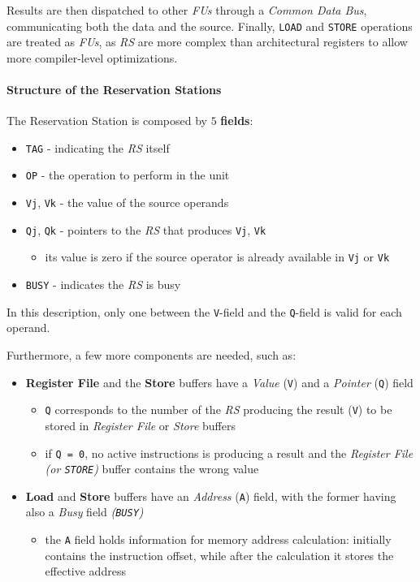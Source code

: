\documentclass[english]{article}
\begin{document}
Results are then dispatched to other \textit{FUs} through a \textit{Common Data Bus}, communicating both the data and the source.
Finally, \texttt{LOAD} and \texttt{STORE} operations are treated as \textit{FUs}, as \textit{RS} are more complex than architectural registers to allow more compiler-level optimizations.

\paragraph{Structure of the Reservation Stations}

The Reservation Station is composed by \(5\) \textbf{fields}:

\begin{itemize}
  \item \texttt{TAG} - indicating the \textit{RS} itself
  \item \texttt{OP} - the operation to perform in the unit
  \item \texttt{Vj}, \texttt{Vk} - the value of the source operands
  \item \texttt{Qj}, \texttt{Qk} - pointers to the \textit{RS} that produces \texttt{Vj}, \texttt{Vk}
        \begin{itemize}
          \item its value is zero if the source operator is already available in \texttt{Vj} or \texttt{Vk}
        \end{itemize}
  \item \texttt{BUSY} - indicates the \textit{RS} is busy
\end{itemize}

In this description, only one between the \texttt{V}-field and the \texttt{Q}-field is valid for each operand.

\bigskip
Furthermore, a few more components are needed, such as:

\begin{itemize}
  \item \textbf{Register File} and the \textbf{Store} buffers have a \textit{Value} (\texttt{V}) and a \textit{Pointer} (\texttt{Q}) field
        \begin{itemize}
          \item \texttt{Q} corresponds to the number of the \textit{RS} producing the result (\texttt{V}) to be stored in \textit{Register File} or \textit{Store} buffers
          \item if \texttt{Q = 0}, no active instructions is producing a result and the \textit{Register File} \textit{(or \texttt{STORE})} buffer contains the wrong value
        \end{itemize}
  \item \textbf{Load} and \textbf{Store} buffers have an \textit{Address} (\texttt{A}) field, with the former having also a \textit{Busy} field \textit{(\texttt{BUSY})}
        \begin{itemize}
          \item the \texttt{A} field holds information for memory address calculation: initially contains the instruction offset, while after the calculation it stores the effective address
        \end{itemize}
\end{itemize}
\end{document}
